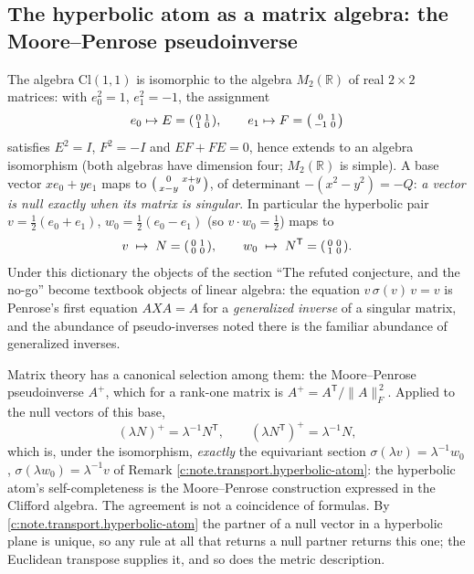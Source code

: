 \documentclass[11pt]{article}
\theoremstyle{definition}
\theoremstyle{plain}
\providecommand{\Cl}{}\renewcommand{\Cl}{\mathrm{Cl}}
\providecommand{\R}{}\renewcommand{\R}{\mathbb{R}}
\begin{document}
\subsection*{The hyperbolic atom as a matrix algebra: the Moore--Penrose pseudoinverse}
\label{c:note.transport.setting-hyperbolic-atom-matrix-algebra-moore}
The algebra $\Cl(1,1)$ is isomorphic to the algebra $M_2(\R)$ of real $2 \times 2$ matrices: with $e_0^2 = 1$, $e_1^2 = -1$, the assignment
\[
e_0 \mapsto E = \begin{psmallmatrix} 0 & 1 \\ 1 & 0 \end{psmallmatrix}, \qquad
e_1 \mapsto F = \begin{psmallmatrix} 0 & 1 \\ -1 & 0 \end{psmallmatrix}
\]
satisfies $E^2 = I$, $F^2 = -I$ and $EF + FE = 0$, hence extends to an algebra isomorphism (both algebras have dimension four; $M_2(\R)$ is simple). A base vector $x e_0 + y e_1$ maps to $\begin{psmallmatrix} 0 & x+y \\ x-y & 0 \end{psmallmatrix}$, of determinant $-(x^2 - y^2) = -Q$: \emph{a vector is null exactly when its matrix is singular}. In particular the hyperbolic pair $v = \tfrac12(e_0 + e_1)$, $w_0 = \tfrac12(e_0 - e_1)$ (so $v \cdot w_0 = \tfrac12$) maps to
\[
v \;\mapsto\; N = \begin{psmallmatrix} 0 & 1 \\ 0 & 0 \end{psmallmatrix}, \qquad
w_0 \;\mapsto\; N^{\mathsf T} = \begin{psmallmatrix} 0 & 0 \\ 1 & 0 \end{psmallmatrix}.
\]
Under this dictionary the objects of the section ``The refuted conjecture, and the no-go'' become textbook objects of linear algebra: the equation $v\,\sigma(v)\,v = v$ is Penrose's first equation $AXA = A$ for a \emph{generalized inverse} of a singular matrix, and the abundance of pseudo-inverses noted there is the familiar abundance of generalized inverses.

Matrix theory has a canonical selection among them: the Moore--Penrose pseudoinverse $A^{+}$, which for a rank-one matrix is $A^{+} = A^{\mathsf T}/\lVert A \rVert_F^{\,2}$. Applied to the null vectors of this base,
\[
(\lambda N)^{+} = \lambda^{-1} N^{\mathsf T}, \qquad (\lambda N^{\mathsf T})^{+} = \lambda^{-1} N,
\]
which is, under the isomorphism, \emph{exactly} the equivariant section $\sigma(\lambda v) = \lambda^{-1} w_0$, $\sigma(\lambda w_0) = \lambda^{-1} v$ of Remark \ref{c:note.transport.hyperbolic-atom}: the hyperbolic atom's self-completeness is the Moore--Penrose construction expressed in the Clifford algebra. The agreement is not a coincidence of formulas. By \ref{c:note.transport.hyperbolic-atom} the partner of a null vector in a hyperbolic plane is unique, so any rule at all that returns a null partner returns this one; the Euclidean transpose supplies it, and so does the metric description.
\end{document}
